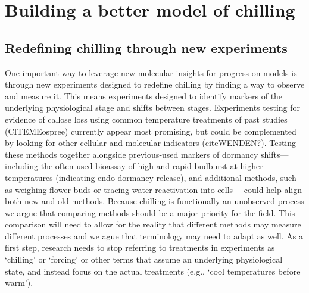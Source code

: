 \documentclass[11pt]{article}
\begin{document}
\section*{Building a better model of chilling} %

\subsection*{Redefining chilling through new experiments} 
One important way to leverage new molecular insights for progress on models is through new experiments designed to redefine chilling by finding a way to observe and measure it. This means experiments  designed to identify markers of the underlying physiological stage and shifts between stages. Experiments testing for evidence of callose loss using common temperature treatments of past studies (CITEMEospree) currently appear most promising, but could be complemented by looking for other cellular and molecular indicators (citeWENDEN?). Testing these methods together alongside previous-used markers of dormancy shifts---including the often-used bioassay of high and rapid budburst at higher temperatures (indicating endo-dormancy release), and additional methods, such as weighing flower buds \citep{chuine2016} or tracing water reactivation into cells \citep{faust1991bound,Kalcsits2009}---could help align both new and old methods. Because chilling is functionally an unobserved process we argue that comparing methods should be a major priority for the field. This comparison will need to allow for the reality that different methods may measure different processes and we ague that terminology may need to adapt as well. As a first step, research needs to stop referring to treatments in experiments as `chilling' or `forcing' or other terms that assume an underlying physiological state, and instead focus on the actual treatments (e.g., `cool temperatures before warm'). 
\end{document}
